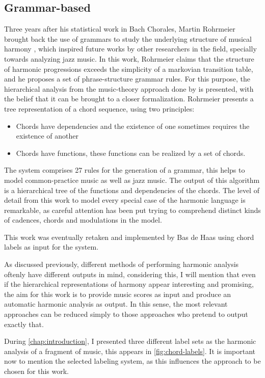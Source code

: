     \subsection{Grammar-based}
    Three years after his statistical work in Bach Chorales, Martin Rohrmeier brought back the use of grammars to study the underlying structure of musical harmony \cite{rohrmeier2011towards}, which inspired future works by other researchers in the field, specially towards analyzing jazz music. In this work, Rohrmeier claims that the structure of harmonic progressions exceeds the simplicity of a markovian transition table, and he proposes a set of phrase-structure grammar rules. For this purpose, the hierarchical analysis from the music-theory approach done by \cite{kostka1995tonal} is presented, with the belief that it can be brought to a closer formalization. Rohrmeier presents a tree representation of a chord sequence, using two principles:
    \begin{itemize}
			\item Chords have dependencies and the existence of one sometimes requires the existence of another
			\item Chords have functions, these functions can be realized by a set of chords.
		\end{itemize}
    The system comprises 27 rules for the generation of a grammar, this helps to model common-practice music as well as jazz music. The output of this algorithm is a hierarchical tree of the functions and dependencies of the chords. The level of detail from this work to model every special case of the harmonic language is remarkable, as careful attention has been put trying to comprehend distinct kinds of cadences, chords and modulations in the model.

    This work was eventually retaken and implemented by Bas de Haas \cite{de2013automatic} using chord labels as input for the system.

    As discussed previously, different methods of performing harmonic analysis oftenly have different outputs in mind, considering this, I will mention that even if the hierarchical representations of harmony appear interesting and promising, the aim for this work is to provide music scores as input and produce an automatic harmonic analysis as output. In this sense, the most relevant approaches can be reduced simply to those approaches who pretend to output exactly that.

  During \autoref{chap:introduction}, I presented three different label sets as the harmonic analysis of a fragment of music, this appears in \autoref{fig:chord-labels}. It is important now to mention the selected labeling system, as this influences the approach to be chosen for this work.

